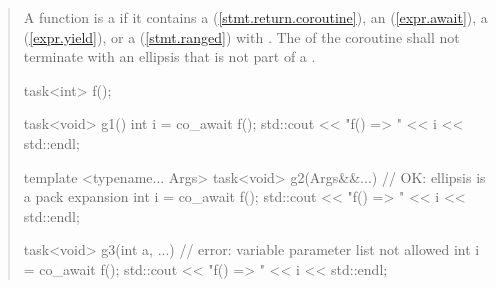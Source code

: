 \begin{quote}
\pnum
A function is a  if it contains a  (\ref{stmt.return.coroutine}),  an  (\ref{expr.await}), a  (\ref{expr.yield}), or a  (\ref{stmt.ranged}) with .
The  of the coroutine shall not terminate with an ellipsis that is not part of a . 




\pnum
\enterexample
\begin{codeblock}
  task<int> f();
  
  task<void> g1() {
    int i = co_await f();
    std::cout << "f() => " << i << std::endl;
  }

  template <typename... Args>
  task<void> g2(Args&&...) { // OK: ellipsis is a pack expansion
    int i = co_await f();
    std::cout << "f() => " << i << std::endl;
  }

  task<void> g3(int a, ...) { // error: variable parameter list not allowed
    int i = co_await f();
    std::cout << "f() => " << i << std::endl;
  }

\end{codeblock}
\exitexample
%
%  
%    



\end{quote}
